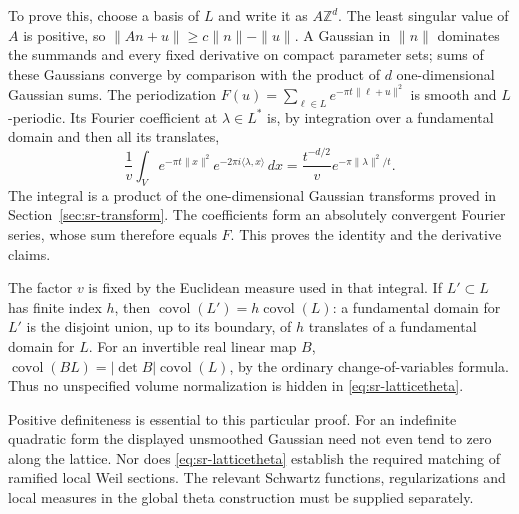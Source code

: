 To prove this, choose a basis of \(L\) and write it as \(A\mathbb Z^d\).
The least singular value of \(A\) is positive, so
\(\|A n+u\|\geq c\|n\|-\|u\|\).
A Gaussian in \(\|n\|\) dominates the summands and every fixed derivative
on compact parameter sets; sums of these Gaussians converge by comparison
with the product of \(d\) one-dimensional Gaussian sums.
The periodization \(F(u)=\sum_{\ell\in L}e^{-\pi t\|\ell+u\|^2}\)
is smooth and \(L\)-periodic. Its Fourier coefficient at \(\lambda\in L^*\)
is, by integration over a fundamental domain and then all its translates,
\[
 \frac1v\int_Ve^{-\pi t\|x\|^2}e^{-2\pi i\langle\lambda,x\rangle}\,dx
 =\frac{t^{-d/2}}v e^{-\pi\|\lambda\|^2/t}.
\]
The integral is a product of the one-dimensional Gaussian transforms
proved in Section~\ref{sec:sr-transform}.
The coefficients form an absolutely convergent Fourier series, whose
sum therefore equals \(F\). This proves the identity and the derivative
claims.

The factor \(v\) is fixed by the Euclidean measure used in that integral.
If \(L'\subset L\) has finite index \(h\), then
\(\operatorname{covol}(L')=h\operatorname{covol}(L)\):
a fundamental domain for \(L'\) is the disjoint union, up to its boundary,
of \(h\) translates of a fundamental domain for \(L\).
For an invertible real linear map \(B\),
\(\operatorname{covol}(BL)=|\det B|\operatorname{covol}(L)\),
by the ordinary change-of-variables formula.
Thus no unspecified volume normalization is hidden in
\eqref{eq:sr-latticetheta}.

Positive definiteness is essential to this particular proof.
For an indefinite quadratic form the displayed unsmoothed Gaussian
need not even tend to zero along the lattice.
Nor does \eqref{eq:sr-latticetheta} establish the required matching of
ramified local Weil sections. The relevant Schwartz functions,
regularizations and local measures in the global theta construction
must be supplied separately.

